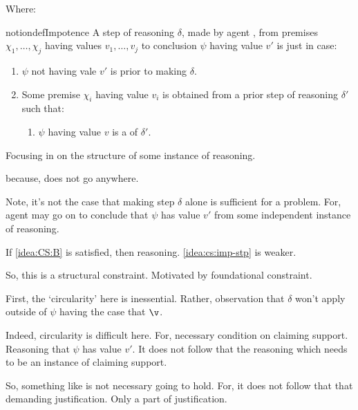 \begin{note}
  Where:
  \begin{restatable}{notion}{defImpotence}
    A step of reasoning \(\delta\), made by agent \vAgent{}, from premises \(\chi_{1},\dots,\chi_{j}\) having values \(v_{1}, \dots, v_{j}\) to conclusion \(\psi\) having value \(v'\) is \emph{\impotent{}} just in case:

    \begin{enumerate}[label=\arabic*., ref=(\arabic*)]
    \item \(\psi\) not having vale \(v'\) is \epVAd{} prior to making \(\delta\).
    \item Some premise \(\chi_{i}\) having value \(v_{i}\) is obtained from a prior step of reasoning \(\delta'\) such that:
      \begin{enumerate}[label=\alph*., ref=(2\alph*)]
      \item
        \label{idea:CS:B:step:requ}
        \(\psi\) having value \(v\) is a \requ{} of \(\delta'\).
      \end{enumerate}
    \end{enumerate}
    \vspace{-\baselineskip}
  \end{restatable}
\end{note}

\begin{note}
  Focusing in on the structure of some instance of reasoning.
\end{note}

\begin{note}
  \impotent{} because, does not go anywhere.
\end{note}

\begin{note}
  \color{red}
  Note, it's not the case that making step \(\delta\) alone is sufficient for a problem.
  For, agent may go on to conclude that \(\psi\) has value \(v'\) from some independent instance of reasoning.
\end{note}

\begin{note}
  If \autoref{idea:CS:B} is satisfied, then reasoning.
  \autoref{idea:cs:imp-stp} is weaker.

  So, this is a structural constraint.
  Motivated by foundational constraint.
\end{note}

\begin{note}
  First, the `circularity' here is inessential.
  Rather, observation that \(\delta\) won't apply outside of \(\psi\) having the case that \(\v\).


  Indeed, circularity is difficult here.
  For, necessary condition on claiming support.
  Reasoning that  \(\psi\) has value \(v'\).
  It does not follow that the reasoning which  needs to be an instance of claiming support.

  So, something like \citeauthor{Sgaravatti:2013wu} is not necessary going to hold.
  For, it does not follow that that demanding justification.
  Only a part of justification.
\end{note}

